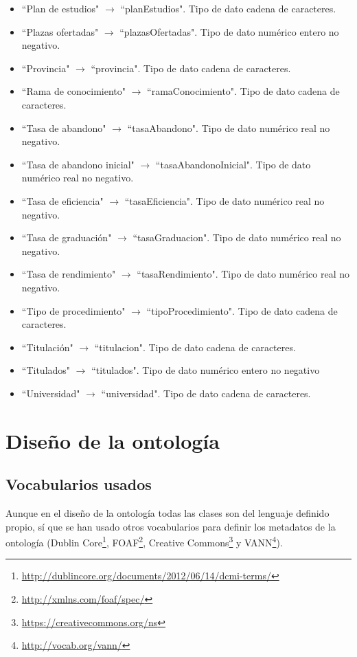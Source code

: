 \begin{itemize}
	\item ``Plan de estudios" $\rightarrow$ ``planEstudios". Tipo de dato cadena de caracteres.
	\item ``Plazas ofertadas" $\rightarrow$ ``plazasOfertadas". Tipo de dato numérico entero no negativo.
	\item ``Provincia" $\rightarrow$ ``provincia". Tipo de dato cadena de caracteres.
	\item ``Rama de conocimiento" $\rightarrow$ ``ramaConocimiento". Tipo de dato cadena de caracteres.
	\item ``Tasa de abandono" $\rightarrow$ ``tasaAbandono". Tipo de dato numérico real no negativo.
	\item ``Tasa de abandono inicial" $\rightarrow$ ``tasaAbandonoInicial". Tipo de dato numérico real no negativo.
	\item ``Tasa de eficiencia" $\rightarrow$ ``tasaEficiencia". Tipo de dato numérico real no negativo.
	\item ``Tasa de graduación" $\rightarrow$ ``tasaGraduacion". Tipo de dato numérico real no negativo.
	\item ``Tasa de rendimiento" $\rightarrow$ ``tasaRendimiento". Tipo de dato numérico real no negativo.
	\item ``Tipo de procedimiento" $\rightarrow$ ``tipoProcedimiento". Tipo de dato cadena de caracteres.
	\item ``Titulación" $\rightarrow$ ``titulacion". Tipo de dato cadena de caracteres.
	\item ``Titulados" $\rightarrow$ ``titulados". Tipo de dato numérico entero no negativo
	\item ``Universidad" $\rightarrow$  ``universidad". Tipo de dato cadena de caracteres.
\end{itemize}

\section{Diseño de la ontología}

\subsection{Vocabularios usados}

Aunque en el diseño de la ontología todas las clases son del lenguaje definido propio, sí que se han usado otros vocabularios para definir los metadatos de la ontología (Dublin Core\footnote{\url{http://dublincore.org/documents/2012/06/14/dcmi-terms/}}, FOAF\footnote{\url{http://xmlns.com/foaf/spec/}}, Creative Commons\footnote{\url{https://creativecommons.org/ns}} y VANN\footnote{\url{http://vocab.org/vann/}}). \bigskip

